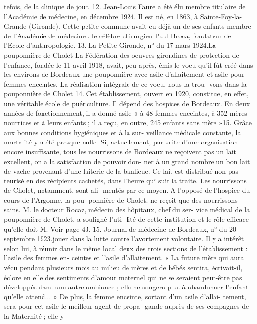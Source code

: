 \documentclass[a4paper,11pt]{book}
\begin{document}
tefois, de la clinique de jour.
12. Jean-Louis Faure a été élu membre titulaire de l'Académie de
médecine, en décembre 1924. Il est né, en 1863, à Sainte-Foy-la-Grande
(Gironde). Cette petite commune avait eu déjà un de ses enfants membre
de l'Académie de médecine : le célèbre chirurgien Paul Broca, fondateur
de l'Ecole d'anthropologie.
13. La Petite Gironde, n° du 17 mars 1924.La pouponnière de Cholet
La Fédération des oeuvres girondines de protection de
l'enfance, fondée le 11 avril 1918, avait, peu après, émis
le voeu qu'il fût créé dans les environs de Bordeaux une
pouponnière avec asile d'allaitement et asile pour femmes
enceintes. La réalisation intégrale de ce voeu, nous la trou-
vons dans la pouponnière de Cholet 14. Cet établissement,
ouvert en 1920, constitue, en effet, une véritable école de
puériculture. Il dépend des hospices de Bordeaux. En deux
années de fonctionnement, il a donné asile « à 48 femmes
enceintes, à 352 mères nourrices et à leurs enfants ; il a
reçu, en outre, 245 enfants sans mère »15.
Grâce aux bonnes conditions hygiéniques et à la sur-
veillance médicale constante, la mortalité y a été presque
nulle.
Si, actuellement, par suite d'une organisation encore
insuffisante, tous les nourrissons de Bordeaux ne reçoivent
pas un lait excellent, on a la satisfaction de pouvoir don-
ner à un grand nombre un bon lait de vache provenant
d'une laiterie de la banlieue. Ce lait est distribué non pas-
teurisé en des récipients cachetés, dans l'heure qui suit
la traite. Les nourrissons de Cholet, notamment, sont ali-
mentés par ce moyen.
A l'opposé de l'hospice du cours de l'Argonne, la pou-
ponnière de Cholet. ne reçoit que des nourrissons sains.
M. le docteur Rocaz, médecin des hôpitaux, chef du ser-
vice médical de la pouponnière de Cholet, a souligné l'uti-
lité de cette institution et le rôle efficace qu'elle doit
M. Voir page 43.
15. Journal de médecine de Bordeaux, n° du 20 septembre 1923.jouer dans la lutte contre l'avortement volontaire. Il y a
intérêt selon lui, à réunir dans le même local deux des
trois sections de l'établissement : l'asile des femmes en-
ceintes et l'asile d'allaitement.
« La future mère qui aura vécu pendant plusieurs mois
au milieu de mères et de bébés sentira, écrivait-il, éclore
en elle des sentiments d'amour maternel qui ne se seraient
peut-être pas développés dans une autre ambiance ; elle
ne songera plus à abandonner l'enfant qu'elle attend...
» De plus, la femme enceinte, sortant d'un asile d'allai-
tement, sera pour cet asile le meilleur agent de propa-
gande auprès de ses compagnes de la Maternité ; elle y
\end{document}
